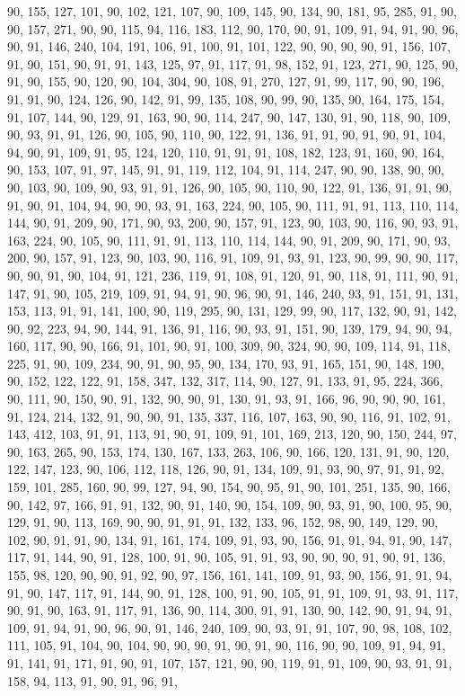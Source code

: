 \begin{sloppypar}
90, 155, 127, 101, 90, 102, 121, 107, 90, 109, 145, 90, 134, 90, 181, 95, 285, 91, 90, 90, 157, 271, 90, 90, 115, 94, 116, 183, 112, 90, 170, 90, 91, 109, 91, 94, 91, 90, 96, 90, 91, 146, 240, 104, 191, 106, 91, 100, 91, 101, 122, 90, 90, 90, 90, 91, 156, 107, 91, 90, 151, 90, 91, 91, 143, 125, 97, 91, 117, 91, 98, 152, 91, 123, 271, 90, 125, 90, 91, 90, 155, 90, 120, 90, 104, 304, 90, 108, 91, 270, 127, 91, 99, 117, 90, 90, 196, 91, 91, 90, 124, 126, 90, 142, 91, 99, 135, 108, 90, 99, 90, 135, 90, 164, 175, 154, 91, 107, 144, 90, 129, 91, 163, 90, 90, 114, 247, 90, 147, 130, 91, 90, 118, 90, 109, 90, 93, 91, 91, 126, 90, 105, 90, 110, 90, 122, 91, 136, 91, 91, 90, 91, 90, 91, 104, 94, 90, 91, 109, 91, 95, 124, 120, 110, 91, 91, 91, 108, 182, 123, 91, 160, 90, 164, 90, 153, 107, 91, 97, 145, 91, 91, 119, 112, 104, 91, 114, 247, 90, 90, 138, 90, 90, 90, 103, 90, 109, 90, 93, 91, 91, 126, 90, 105, 90, 110, 90, 122, 91, 136, 91, 91, 90, 91, 90, 91, 104, 94, 90, 90, 93, 91, 163, 224, 90, 105, 90, 111, 91, 91, 113, 110, 114, 144, 90, 91, 209, 90, 171, 90, 93, 200, 90, 157, 91, 123, 90, 103, 90, 116, 90, 93, 91, 163, 224, 90, 105, 90, 111, 91, 91, 113, 110, 114, 144, 90, 91, 209, 90, 171, 90, 93, 200, 90, 157, 91, 123, 90, 103, 90, 116, 91, 109, 91, 93, 91, 123, 90, 99, 90, 90, 117, 90, 90, 91, 90, 104, 91, 121, 236, 119, 91, 108, 91, 120, 91, 90, 118, 91, 111, 90, 91, 147, 91, 90, 105, 219, 109, 91, 94, 91, 90, 96, 90, 91, 146, 240, 93, 91, 151, 91, 131, 153, 113, 91, 91, 141, 100, 90, 119, 295, 90, 131, 129, 99, 90, 117, 132, 90, 91, 142, 90, 92, 223, 94, 90, 144, 91, 136, 91, 116, 90, 93, 91, 151, 90, 139, 179, 94, 90, 94, 160, 117, 90, 90, 166, 91, 101, 90, 91, 100, 309, 90, 324, 90, 90, 109, 114, 91, 118, 225, 91, 90, 109, 234, 90, 91, 90, 95, 90, 134, 170, 93, 91, 165, 151, 90, 148, 190, 90, 152, 122, 122, 91, 158, 347, 132, 317, 114, 90, 127, 91, 133, 91, 95, 224, 366, 90, 111, 90, 150, 90, 91, 132, 90, 90, 91, 130, 91, 93, 91, 166, 96, 90, 90, 90, 161, 91, 124, 214, 132, 91, 90, 90, 91, 135, 337, 116, 107, 163, 90, 90, 116, 91, 102, 91, 143, 412, 103, 91, 91, 113, 91, 90, 91, 109, 91, 101, 169, 213, 120, 90, 150, 244, 97, 90, 163, 265, 90, 153, 174, 130, 167, 133, 263, 106, 90, 166, 120, 131, 91, 90, 120, 122, 147, 123, 90, 106, 112, 118, 126, 90, 91, 134, 109, 91, 93, 90, 97, 91, 91, 92, 159, 101, 285, 160, 90, 99, 127, 94, 90, 154, 90, 95, 91, 90, 101, 251, 135, 90, 166, 90, 142, 97, 166, 91, 91, 132, 90, 91, 140, 90, 154, 109, 90, 93, 91, 90, 100, 95, 90, 129, 91, 90, 113, 169, 90, 90, 91, 91, 91, 132, 133, 96, 152, 98, 90, 149, 129, 90, 102, 90, 91, 91, 90, 134, 91, 161, 174, 109, 91, 93, 90, 156, 91, 91, 94, 91, 90, 147, 117, 91, 144, 90, 91, 128, 100, 91, 90, 105, 91, 91, 93, 90, 90, 90, 91, 90, 91, 136, 155, 98, 120, 90, 90, 91, 92, 90, 97, 156, 161, 141, 109, 91, 93, 90, 156, 91, 91, 94, 91, 90, 147, 117, 91, 144, 90, 91, 128, 100, 91, 90, 105, 91, 91, 109, 91, 93, 91, 117, 90, 91, 90, 163, 91, 117, 91, 136, 90, 114, 300, 91, 91, 130, 90, 142, 90, 91, 94, 91, 109, 91, 94, 91, 90, 96, 90, 91, 146, 240, 109, 90, 93, 91, 91, 107, 90, 98, 108, 102, 111, 105, 91, 104, 90, 104, 90, 90, 90, 91, 90, 91, 90, 116, 90, 90, 109, 91, 94, 91, 91, 141, 91, 171, 91, 90, 91, 107, 157, 121, 90, 90, 119, 91, 91, 109, 90, 93, 91, 91, 158, 94, 113, 91, 90, 91, 96, 91, 
\end{sloppypar}
